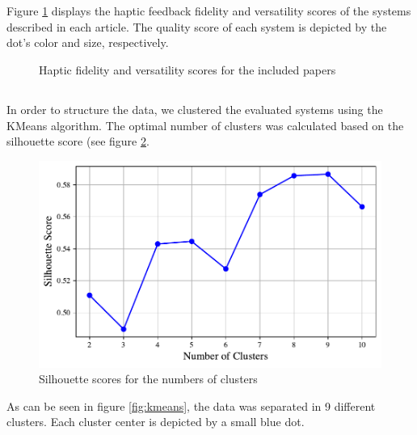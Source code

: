 \twocolumn

\section{}
Figure \ref{fig:fidelity_plot} displays the haptic feedback fidelity and versatility scores of the systems described in each article. The quality score of each system is depicted by the dot's color and size, respectively.

\begin{figure}[htbp]
    
    \caption{Haptic fidelity and versatility scores for the included papers}
    \label{fig:fidelity_plot}
\end{figure}

\subsection{}

In order to structure the data, we clustered the evaluated systems using the KMeans algorithm. The optimal number of clusters was calculated based on the silhouette score \cite{Rousseeuw1987Silhouettes:Analysis} (see figure \ref{fig:silhouette}.

\begin{figure}[htbp]
    \centering
    \includegraphics[width=\columnwidth]{figures/silhouette.pdf} 
    \caption{Silhouette scores for the numbers of clusters}
    \label{fig:silhouette}
\end{figure}

As can be seen in figure \ref{fig:kmeans}, the data was separated in 9 different clusters. Each cluster center is depicted by a small blue dot.

